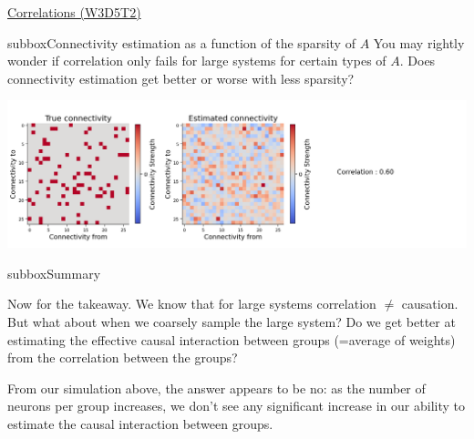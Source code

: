 \begin{textbox}{\href{https://compneuro.neuromatch.io/tutorials/W3D5_NetworkCausality/student/W3D5_Tutorial2.html}{Correlations (W3D5T2)}   }
\begin{subbox}{subbox}{Connectivity estimation as a function of the sparsity of $A$}
You may rightly wonder if correlation only fails for large systems for certain types of $A$. Does connectivity estimation get better or worse with less sparsity?

\begin{center}

\includegraphics[scale=0.15]{Figures/NC/NC_Figure12.png}
\end{center}
\end{subbox}

\begin{subbox}{subbox}{Summary}
\scriptsize


Now for the takeaway. We know that for large systems correlation $\not=$ causation. But what about when we coarsely sample the large system? Do we get better at estimating the effective causal interaction between groups (=average of weights) from the correlation between the groups?

From our simulation above, the answer appears to be no: as the number of neurons per group increases, we don't see any significant increase in our ability to estimate the causal interaction between groups.

\end{subbox}
\end{textbox}
\newpage
